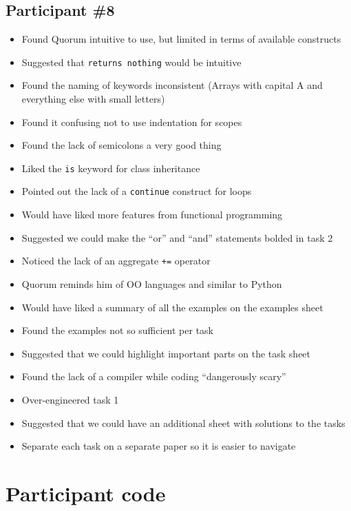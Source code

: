 \section{Participant {\#}8}
\begin{itemize}
\item Found Quorum intuitive to use, but limited in terms of available constructs
\item Suggested that \lstinline!returns nothing! would be intuitive
\item Found the naming of keywords inconsistent (Arrays with capital A and everything else with small letters)
\item Found it confusing not to use indentation for scopes
\item Found the lack of semicolons a very good thing
\item Liked the \lstinline!is! keyword for class inheritance
\item Pointed out the lack of a \lstinline!continue! construct for loops
\item Would have liked more features from functional programming
\item Suggested we could make the “or” and “and” statements bolded in task 2
\item Noticed the lack of an aggregate \lstinline!+=! operator
\item Quorum reminds him of OO languages and similar to Python
\item Would have liked a summary of all the examples on the examples sheet
\item Found the examples not so sufficient per task
\item Suggested that we could highlight important parts on the task sheet 
\item Found the lack of a compiler while coding “dangerously scary”
\item Over-engineered task 1 
\item Suggested that we could have an additional sheet with solutions to the tasks
\item Separate each task on a separate paper so it is easier to navigate 
\end{itemize}
\chapter{Participant code}
